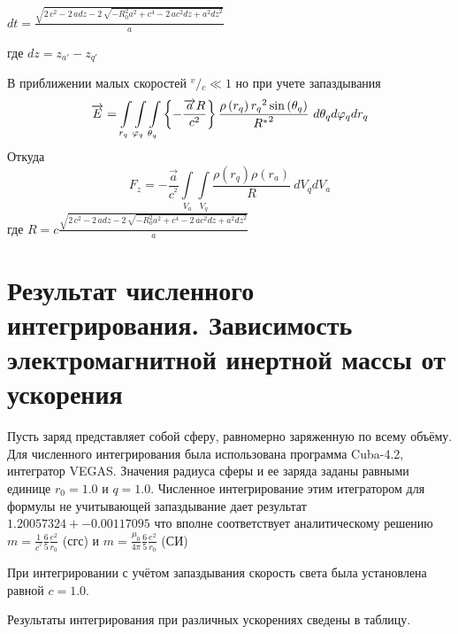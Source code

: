 \documentclass{article}
\begin{document}

$\mathit{dt} = \frac{\sqrt{2 \, c^{2} - 2 \, a \mathit{dz} - 2 \, \sqrt{-R_{0}^{2} a^{2} + c^{4} - 2 \, a c^{2} \mathit{dz} + a^{2} \mathit{dz}^{2}}}}{a}$

где
$\mathit{dz} = z_{a'} - z_{q'}$


В приближении малых скоростей ${}^{v}/{}_{c}\ll 1$ но при учете запаздывания
\[\overrightarrow{E}=\int\limits_{{{r}_{q}}}\int\limits_{{{\varphi}_{q}}}\int\limits_{{{\theta}_{q}}}\\
{\left\{ -\frac{\overrightarrow{a}R}{{{c}^{2}}} \right\}\frac{\rho \left( {{r}_{q}} \right){{r}_{q}}^{2}\sin \left( {{\theta }_{q}} \right)}{{{R}^{*}}^{2}}\ }d{{\theta }_{q}}d{{\varphi }_{q}}d{{r}_{q}}\]
 Откуда
\[{{F}_{z}}=-\frac{\overrightarrow{a}}{{{c}^{^{2}}}}\int\limits_{{{V}_{a}}}{\int\limits_{{{V}_{q}}}{\frac{\rho \left( {{r}_{q}} \right)\rho \left( {{r}_{a}} \right)}{R}}}\ d{{V}_{q}}d{{V}_{a}}\]
где
$\mathit{R} = c\frac{\sqrt{2 \, c^{2} - 2 \, a \mathit{dz} - 2 \, \sqrt{-R_{0}^{2} a^{2} + c^{4} - 2 \, a c^{2} \mathit{dz} + a^{2} \mathit{dz}^{2}}}}{a}$

\section{Результат численного интегрирования. Зависимость электромагнитной инертной массы от ускорения}

Пусть заряд представляет собой сферу, равномерно заряженную по всему объёму.
Для численного интегрирования была использована программа Cuba-4.2, интегратор VEGAS.
Значения радиуса сферы и ее заряда заданы равными единице $r_{0} = 1.0$ и $q = 1.0$.
Численное интегрирование этим итегратором для формулы не учитывающей запаздывание дает результат
$1.20057324 +- 0.00117095$ что вполне соответствует аналитическому решению
$m =\frac{1}{{{c}^{^{2}}}}\frac{6}{5}\frac{e^2}{{{r}_{0}}}$ (сгс) и
$m =\frac{{{\mu }_{0}}}{4\pi }\frac{6}{5}\frac{e^2}{{{r}_{0}}}$ (СИ)

При интегрировании с учётом запаздывания скорость света была установлена равной $c = 1.0$.

Результаты интегрирования при различных ускорениях сведены в таблицу.
\end{document}
